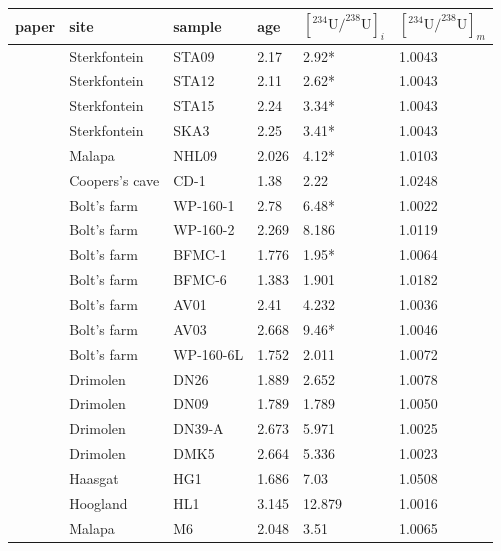 \documentclass[11pt]{article}
\begin{document}
\begin{table}[!ht]
  \begin{tabular}{llllll}
    \hline
    paper & site & sample & age &
    $\left[^{234}\mbox{U}{/}^{238}\mbox{U}\right]_i$ &
    $\left[^{234}\mbox{U}{/}^{238}\mbox{U}\right]_m$ \\ \hline
    \citet{walker2006} & Sterkfontein & STA09 & 2.17 & 2.92* & 1.0043 \\
    \citet{walker2006} & Sterkfontein & STA12 & 2.11 & 2.62* & 1.0043 \\
    \citet{walker2006} & Sterkfontein & STA15 & 2.24 & 3.34* & 1.0043 \\
    \citet{walker2006} & Sterkfontein & SKA3 & 2.25 & 3.41* & 1.0043 \\
    \citet{dirks2010} & Malapa & NHL09 & 2.026 & 4.12* & 1.0103 \\
    \citet{pickering2019} & Coopers’s cave & CD-1 & 1.38 & 2.22 & 1.0248 \\
    \citet{pickering2019} & Bolt’s farm & WP-160-1 & 2.78 & 6.48* & 1.0022 \\
    \citet{pickering2019} & Bolt’s farm & WP-160-2 & 2.269 & 8.186 & 1.0119 \\
    \citet{pickering2019} & Bolt’s farm & BFMC-1 & 1.776 & 1.95* & 1.0064 \\
    \citet{pickering2019} & Bolt’s farm & BFMC-6 & 1.383 & 1.901 & 1.0182 \\
    \citet{pickering2019} & Bolt’s farm & AV01 & 2.41 & 4.232 & 1.0036 \\
    \citet{pickering2019} & Bolt’s farm & AV03 & 2.668 & 9.46* & 1.0046 \\
    \citet{pickering2019} & Bolt’s farm & WP-160-6L & 1.752 & 2.011 & 1.0072 \\
    \citet{pickering2019} & Drimolen & DN26 & 1.889 & 2.652 & 1.0078 \\
    \citet{pickering2019} & Drimolen & DN09 & 1.789 & 1.789 & 1.0050 \\
    \citet{pickering2019} & Drimolen & DN39-A & 2.673 & 5.971 & 1.0025 \\
    \citet{pickering2019} & Drimolen & DMK5 & 2.664 & 5.336 & 1.0023 \\
    \citet{pickering2019} & Haasgat & HG1 & 1.686 & 7.03 & 1.0508 \\
    \citet{pickering2019} & Hoogland & HL1 & 3.145 & 12.879 & 1.0016 \\
    \citet{pickering2019} & Malapa & M6 & 2.048 & 3.51 & 1.0065 \\

\end{tabular}
\end{table}
\end{document}
